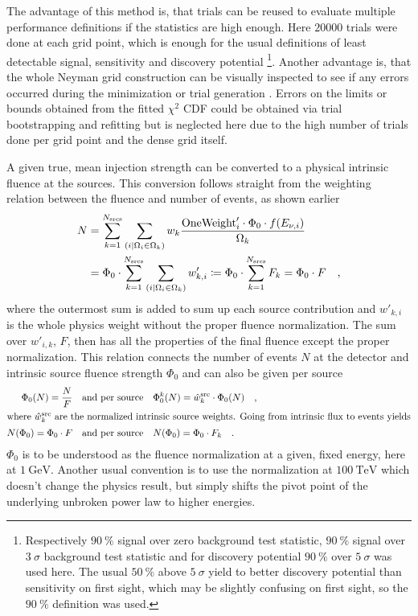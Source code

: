 The advantage of this method is, that trials can be reused to evaluate multiple performance definitions if the statistics are high enough.
Here $\num{20000}$ trials were done at each grid point, which is enough for the usual definitions of least detectable signal, sensitivity and discovery potential \footnote{Respectively $\SI{90}{\percent}$ signal over zero background test statistic, $\SI{90}{\percent}$ signal over $\SI{3}{\sigma}$ background test statistic and for discovery potential $\SI{90}{\percent}$ over $\SI{5}{\sigma}$ was used here. The usual $\SI{50}{\percent}$ above $\SI{5}{\sigma}$ yield to better discovery potential than sensitivity on first sight, which may be slightly confusing on first sight, so the $\SI{90}{\percent}$ definition was used.}.
Another advantage is, that the whole Neyman grid construction can be visually inspected to see if any errors occurred during the minimization or trial generation .
Errors on the limits or bounds obtained from the fitted $\chi^2$ CDF could be obtained via trial bootstrapping and refitting but is neglected here due to the high number of trials done per grid point and the dense grid itself.

A given true, mean injection strength can be converted to a physical intrinsic fluence at the sources.
This conversion follows straight from the weighting relation between the fluence and number of events, as shown earlier
\begin{align}
  N &= \sum_{k=1}^{N_\text{srcs}} \sum_{(i|\Omega_i \in \Omega_k)}
    w_k\frac{\text{OneWeight}'_i\cdot\Phi_0\cdot f(E_{\nu,i})}{\Omega_k} \\
  &= \Phi_0 \cdot
      \sum_{k=1}^{N_\text{srcs}}
      \sum_{(i|\Omega_i \in \Omega_k)} w'_{k,i}
  \coloneqq \Phi_0 \cdot \sum_{k=1}^{N_\text{srcs}} F_k = \Phi_0 \cdot F
  \quad\text{,}
\end{align}
where the outermost sum is added to sum up each source contribution and $w'_{k,i}$ is the whole physics weight without the proper fluence normalization.
The sum over $w'_{i,k}$, $F$, then has all the properties of the final fluence except the proper normalization.
This relation connects the number of events $N$ at the detector and intrinsic source fluence strength $\Phi_0$ and can also be given per source
\begin{align}
  \Phi_0(N) = \frac{N}{F}
    &\quad\text{and per source}\quad
    \Phi_0^k(N) = \hat{w}_k^\text{src} \cdot \Phi_0(N)
    \quad\text{,} \\
  \intertext{where $\hat{w}_k^\text{src}$ are the normalized intrinsic source weights. Going from intrinsic flux to events yields}
  N(\Phi_0) = \Phi_0 \cdot F
    &\quad\text{and per source}\quad
    N(\Phi_0) = \Phi_0 \cdot F_k
  \quad\text{.}
\end{align}
$\Phi_0$ is to be understood as the fluence normalization at a given, fixed energy, here at $\SI{1}{\GeV}$.
Another usual convention is to use the normalization at $\SI{100}{\TeV}$ which doesn't change the physics result, but simply shifts the pivot point of the underlying unbroken power law to higher energies.

